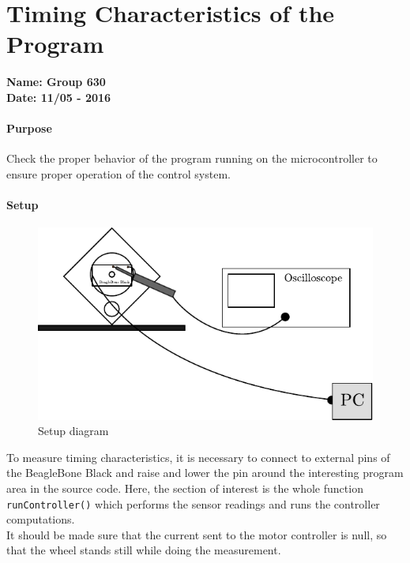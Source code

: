 \chapter{Timing Characteristics of the Program}\label{app:TimingProgram} 
\textbf{Name: Group 630}\\
\textbf{Date: 11/05 - 2016}

\subsubsection{Purpose}
Check the proper behavior of the program running on the microcontroller to ensure proper operation of the control system.

\subsubsection{Setup}
\begin{figure}[H]
  \centering
  \includegraphics[scale=1]{figures/programTimingSetup}
  \caption{Setup diagram}
  \label{LabSetupRangeTest}
\end{figure}

To measure timing characteristics, it is necessary to connect to external pins of the BeagleBone Black and raise and lower the pin around the interesting program area in the source code. Here, the section of interest is the whole function \lstinline{runController()} which performs the sensor readings and runs the controller computations.\\
It should be made sure that the current sent to the motor controller is null, so that the wheel stands still while doing the measurement.

